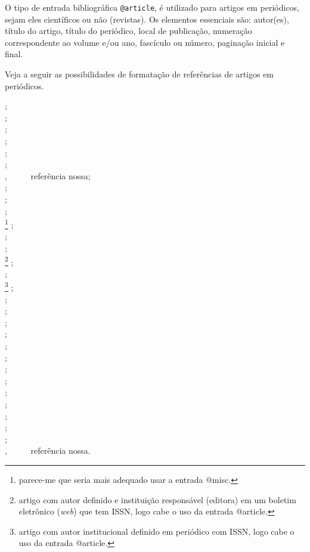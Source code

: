 \begin{apendicesenv}
O tipo de entrada bibliográfica \verb|@article|, é utilizado para artigos em periódicos, sejam eles científicos ou não (revistas). Os elementos essenciais são: autor(es), título do artigo, título do periódico, local de publicação, numeração correspondente ao volume e/ou ano, fascículo ou número, paginação inicial e final.

Veja a seguir as possibilidades de formatação de referências de artigos em periódicos.

{\small
    \cite{Alcarde1996} ;\\
    \cite{barros1995} ;\\
    \cite{benetton1993} ;\\
    \cite{brasil1966} ;\\
    \cite{brasil1999} ;\\
    \cite{brasillex1998} ;\\
    \cite{Carvalho2001} , \ \ \ \ \ referência nossa;\\
    \cite{Chakrabarti2006} ;\\
    \cite{Cost1998} ;\\
    \cite{figueirde1996} ;\\
    \cite{fraipont1998}\footnote{parece-me que seria mais adequado usar a entrada {\ttfamily @misc}.} ;\\
    \cite{gsilva1998} ;\\
    \cite{gurgel1997} ;\\
    \cite{kelly1996}\footnote{artigo com autor definido e instituição responsável (editora) em um boletim eletrônico (\textit{web}) que tem ISSN, logo cabe o uso da entrada {\ttfamily @article}.} ;\\
    \cite{leal1999} ;\\
    \cite{leis1991}\footnote{artigo com autor institucional definido em periódico com ISSN, logo cabe o uso da entrada {\ttfamily @article}.} ;\\
    \cite{leitao1989} ;\\
    \cite{lex1943} ;\\
    \cite{lex1998} ;\\
    \cite{lion1981} ;\\
    \cite{mansilla1998} ;\\
    \cite{marins1991} ;\\
    \cite{naves1999} ;\\
    \cite{nordeste1998} ;\\
    \cite{pc1998} ;\\
    \cite{ribeiro1998} ;\\
    \cite{silva1988} ;\\
    \cite{silva1998} ;\\
    \cite{tourinho1997} ;\\
    \cite{vanGELDER1998} , \ \ \ \ \ referência nossa.\\
}




\end{apendicesenv}
